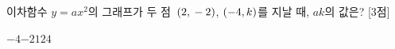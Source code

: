 이차함수 $y=ax^2$의 그래프가 두 점~$(2{,}\mkern3mu -2)$, $(-4{,}\mkern3mu k)$를 지날 때, $ak$의 값은?  \mbox{[3점]}
\begin{choices32}{$-4$}{$-2$}{$1$}{$2$}{$4$}\end{choices32}
